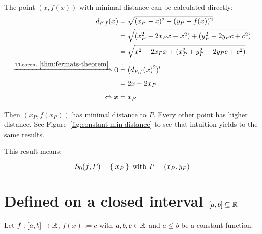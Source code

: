 The point $(x, f(x))$ with minimal distance can be calculated directly:
\begin{align}
    d_{P,f}(x) &= \sqrt{(x_P - x)^2 + (y_P - f(x))^2}\\
               &= \sqrt{(x_P^2 - 2x_P x + x^2) + (y_P^2 - 2 y_P c + c^2)} \\
               &= \sqrt{x^2 - 2 x_P x + (x_P^2 + y_P^2 - 2 y_P c + c^2)}\label{eq:constant-function-distance}\\
 \xRightarrow{\text{Theorem}~\ref{thm:fermats-theorem}} 0 &\stackrel{!}{=} (d_{P,f}(x)^2)'\\
              &= 2x - 2x_P\\
  \Leftrightarrow x &\stackrel{!}{=} x_P
\end{align}

Then $(x_P,f(x_P))$ has
minimal distance to $P$. Every other point has higher distance.
See Figure~\ref{fig:constant-min-distance} to see that intuition
yields to the same results.

This result means:

\[S_0(f, P) = \Set{x_P} \text{ with } P = (x_P, y_P)\]
\clearpage

\section{Defined on a closed interval $[a,b] \subseteq \mathbb{R}$}
Let $f:[a,b] \rightarrow \mathbb{R}$, $f(x) := c$ with $a,b,c \in \mathbb{R}$ and 
$a \leq b$ be a constant function. 

